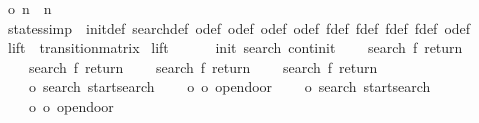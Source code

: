 \begin{isabellebody}
\isanewline
{}\isamarkupfalse%
\ {\isachardoublequoteopen}o\ n\ {\isacharequal}\ n\ {\isacharplus}\ {}{\isachardoublequoteclose}\isanewline
\isanewline
{}\isamarkupfalse%
\ states{\isacharbrackleft}simp{\isacharbrackright}\ {\isacharequal}\ init{\isacharunderscore}def\ search{\isacharunderscore}def\ o{}{\isacharunderscore}def\ o{}{\isacharunderscore}def\ o{}{\isacharunderscore}def\ o{}{\isacharunderscore}def\ f{}{\isacharunderscore}def\ f{}{\isacharunderscore}def\ f{}{\isacharunderscore}def\ f{}{\isacharunderscore}def\ o{\isacharunderscore}def\isanewline
\isanewline
{}\isamarkupfalse%
\ {\isachardoublequoteopen}lift{\isachardoublequoteclose}\ {\isacharcolon}{\isacharcolon}\ {\isachardoublequoteopen}transition{\isacharunderscore}matrix{\isachardoublequoteclose}\ \isanewline
{\isachardoublequoteopen}lift\ {\isasymequiv}\ {\isacharbraceleft}{\isacharbar}\isanewline
\ \ \ \ {\isacharparenleft}{\isacharparenleft}init{\isacharcomma}\ search{\isacharparenright}{\isacharcomma}\ continit{\isacharparenright}{\isacharcomma}\isanewline
\isanewline
\ \ \ \ {\isacharparenleft}{\isacharparenleft}search{\isacharcomma}\ f{}{\isacharparenright}{\isacharcomma}\ return{}{\isacharparenright}{\isacharcomma}\isanewline
\ \ \ \ {\isacharparenleft}{\isacharparenleft}search{\isacharcomma}\ f{}{\isacharparenright}{\isacharcomma}\ return{}{\isacharparenright}{\isacharcomma}\isanewline
\ \ \ \ {\isacharparenleft}{\isacharparenleft}search{\isacharcomma}\ f{}{\isacharparenright}{\isacharcomma}\ return{}{\isacharparenright}{\isacharcomma}\isanewline
\ \ \ \ {\isacharparenleft}{\isacharparenleft}search{\isacharcomma}\ f{}{\isacharparenright}{\isacharcomma}\ return{}{\isacharparenright}{\isacharcomma}\isanewline
\isanewline
\ \ \ \ {\isacharparenleft}{\isacharparenleft}o{}{\isacharcomma}\ search{\isacharparenright}{\isacharcomma}\ startsearch{\isacharparenright}{\isacharcomma}\isanewline
\ \ \ \ {\isacharparenleft}{\isacharparenleft}o{}{\isacharcomma}\ o{}{\isacharparenright}{\isacharcomma}\ opendoor{}{\isacharparenright}{\isacharcomma}\isanewline
\isanewline
\ \ \ \ {\isacharparenleft}{\isacharparenleft}o{}{\isacharcomma}\ search{\isacharparenright}{\isacharcomma}\ startsearch{\isacharparenright}{\isacharcomma}\isanewline
\ \ \ \ {\isacharparenleft}{\isacharparenleft}o{}{\isacharcomma}\ o{}{\isacharparenright}{\isacharcomma}\ opendoor{}{\isacharparenright}{\isacharcomma}\isanewline

\end{isabellebody}
